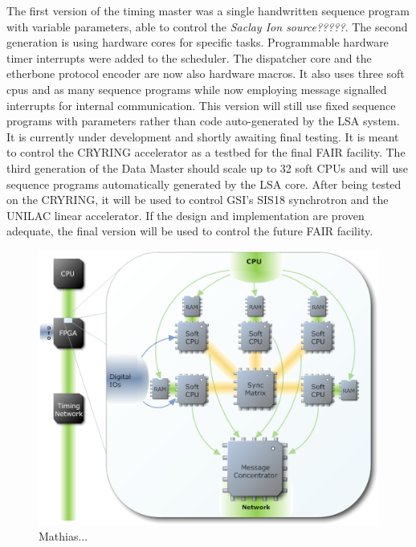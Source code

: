 The first version of the timing master was a single handwritten sequence program
with variable parameters, able to control the \textit{Saclay Ion source?????}.
The second generation is using hardware cores for specific tasks.
Programmable hardware timer interrupts were added to the scheduler.
The dispatcher core and the etherbone protocol encoder are now also hardware
macros. It also uses three soft cpus and as many sequence programs while now
employing message signalled interrupts for internal communication.
This version will still use fixed sequence programs with parameters rather
than code auto-generated by the LSA system. It is currently under development and
shortly awaiting final testing. It is meant to control the CRYRING accelerator
as a testbed for the final FAIR facility. The third generation of the Data Master should scale up to 32 soft CPUs and
will use sequence programs automatically generated by the LSA core. After being
tested on the CRYRING, it will be used to control GSI's SIS18 synchrotron and the UNILAC linear
accelerator. If the design and implementation are proven adequate, the final version will
be used to control the future FAIR facility.

\begin{figure}[htb]
   \centering
   \includegraphics*[scale=0.33]{fig/fatima7.eps}
   \caption{Mathias...}
   \label{fatima}
\end{figure}


